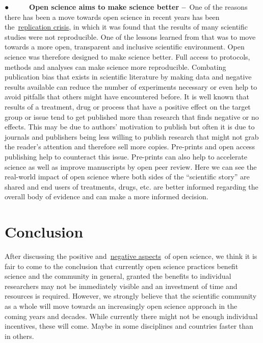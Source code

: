 \documentclass[
]{book}
\begin{document}
● ~ ~ ~ \textbf{Open science aims to make science better --}~One of the reasons there has been a move towards open science in recent years has been the~\href{https://en.wikipedia.org/wiki/Replication_crisis}{}\href{https://en.wikipedia.org/wiki/Replication_crisis}{replication crisis}, in which it was found that the results of many scientific studies were not reproducible. One of the lessons learned from that was to move towards a more open, transparent and inclusive scientific environment. Open science was therefore designed to make science better. Full access to protocols, methods and analyses can make science more reproducible. Combating publication bias that exists in scientific literature by making data and negative results available can reduce the number of experiments necessary or even help to avoid pitfalls that others might have encountered before. It is well known that results of a treatment, drug or process that have a positive effect on the target group or issue tend to get published more than research that finds negative or no effects. This may be due to authors' motivation to publish but often it is due to journals and publishers being less willing to publish research that might not grab the reader's attention and therefore sell more copies. Pre-prints and open access publishing help to counteract this issue. Pre-prints can also help to accelerate science as well as improve manuscripts by open peer review. Here we can see the real-world impact of open science where both sides of the ``scientific story'' are shared and end users of treatments, drugs, etc. are better informed regarding the overall body of evidence and can make a more informed decision.

\hypertarget{conclusion}{%
\section{\texorpdfstring{\textbf{Conclusion}}{Conclusion}}\label{conclusion}}

After discussing the positive and~\href{https://www.pygaze.org/2016/03/the-downsides-of-open-science-that-nobody-talks-about/}{}\href{https://www.pygaze.org/2016/03/the-downsides-of-open-science-that-nobody-talks-about/}{negative aspects}~of open science, we think it is fair to come to the conclusion that currently open science practices benefit science and the community in general, granted the benefits to individual researchers may not be immediately visible and an investment of time and resources is required. However, we strongly believe that the scientific community as a whole will move towards an increasingly open science approach in the coming years and decades. While currently there might not be enough individual incentives, these will come. Maybe in some disciplines and countries faster than in others.
\end{document}
